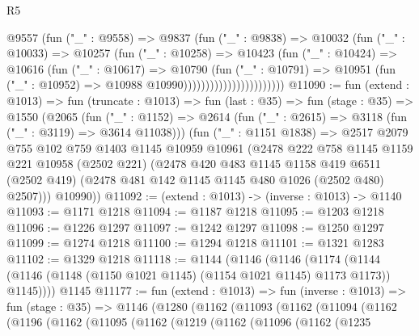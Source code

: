 \begin{lexlean}{R5}
\begin{coremodule}
                                @9557
                                  (fun ("_" : @9558) =>
                                  @9837
                                    (fun ("_" : @9838) =>
                                    @10032
                                      (fun ("_" : @10033) =>
                                      @10257
                                        (fun ("_" : @10258) =>
                                        @10423
                                          (fun ("_" : @10424) =>
                                          @10616
                                            (fun ("_" : @10617) =>
                                            @10790
                                              (fun ("_" : @10791) =>
                                              @10951
                                                (fun ("_" : @10952) =>
                                                @10988 @10990)))))))))))))))))))))))
@11090 := fun (extend : @1013) =>
  fun (truncate : @1013) =>
  fun (last : @35) =>
  fun (stage : @35) =>
  @1550
    (@2065
      (fun ("_" : @1152) => @2614 (fun ("_" : @2615) => @3118 (fun ("_" : @3119) => @3614 @11038)))
      (fun ("_" : @1151 @1838) =>
      @2517
        @2079
        @755
        @102
        @759
        @1403
        @1145
        @10959
        @10961
        (@2478
          @222
          @758
          @1145
          @1159
          @221
          @10958
          (@2502 @221)
          (@2478
            @420
            @483
            @1145
            @1158
            @419
            @6511
            (@2502 @419)
            (@2478 @481 @142 @1145 @1145 @480 @1026 (@2502 @480) @2507)))
        @10990))
@11092 := (extend : @1013) -> (inverse : @1013) -> @1140
@11093 := @1171 @1218
@11094 := @1187 @1218
@11095 := @1203 @1218
@11096 := @1226 @1297
@11097 := @1242 @1297
@11098 := @1250 @1297
@11099 := @1274 @1218
@11100 := @1294 @1218
@11101 := @1321 @1283
@11102 := @1329 @1218
@11118 := @1144
    (@1146
      (@1146
        (@1174 (@1144 (@1146 (@1148 (@1150 @1021 @1145) (@1154 @1021 @1145) @1173 @1173)) @1145))))
    @1145
@11177 := fun (extend : @1013) =>
  fun (inverse : @1013) =>
  fun (stage : @35) =>
  @1146
    (@1280
      (@1162
        (@11093
          (@1162
            (@11094
              (@1162
                (@1196
                  (@1162
                    (@11095
                      (@1162
                        (@1219
                          (@1162
                            (@11096
                              (@1162
                                (@1235

\end{coremodule}
\end{lexlean}
